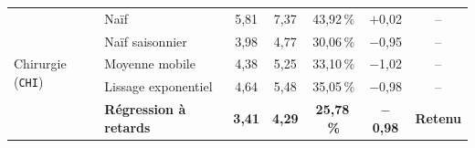 \begin{table}[H]
{\begin{tabular}{llccccc}
        \midrule
        \multirow{5}{*}{Chirurgie (\texttt{CHI})} & Naïf & 5{,}81 & 7{,}37 & 43{,}92\,\% & $+$0{,}02 & -- \\
         & Naïf saisonnier & 3{,}98 & 4{,}77 & 30{,}06\,\% & $-$0{,}95 & -- \\
         & Moyenne mobile & 4{,}38 & 5{,}25 & 33{,}10\,\% & $-$1{,}02 & -- \\
         & Lissage exponentiel & 4{,}64 & 5{,}48 & 35{,}05\,\% & $-$0{,}98 & -- \\
         & \textbf{Régression à retards} & \textbf{3{,}41} & \textbf{4{,}29} & \textbf{25{,}78\,\%} & \textbf{$-$0{,}98} & \textbf{Retenu} \\
        \bottomrule
    \end{tabular}}
\end{table}
